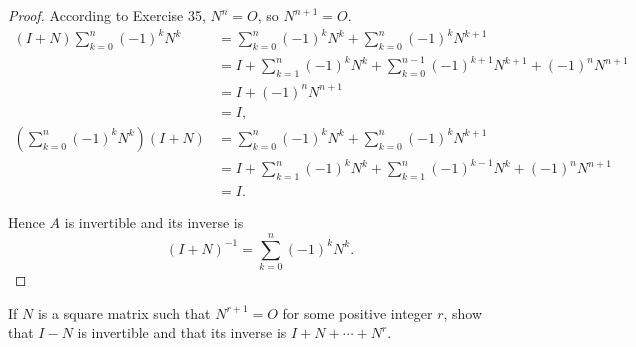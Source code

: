 \begin{proof}
    According to Exercise 35, $N^{n} = O$, so $N^{n+1} = O$.
    \begin{align*}
        (I + N)\sum^{n}_{k=0}{(-1)}^{k}N^{k}              & = \sum^{n}_{k=0}{(-1)}^{k}N^{k} + \sum^{n}_{k=0}{{(-1)}^{k}}N^{k+1}                           \\
                                                          & = I + \sum^{n}_{k=1}{(-1)}^{k}N^{k} + \sum^{n-1}_{k=0}{(-1)}^{k+1}N^{k+1} + {(-1)}^{n}N^{n+1} \\
                                                          & = I + {(-1)}^{n}N^{n+1}                                                                       \\
                                                          & = I,                                                                                          \\
        \left(\sum^{n}_{k=0}{(-1)}^{k}N^{k}\right)(I + N) & = \sum^{n}_{k=0}{(-1)}^{k}N^{k} + \sum^{n}_{k=0}{(-1)}^{k}N^{k+1}                             \\
                                                          & = I + \sum^{n}_{k=1}{(-1)}^{k}N^{k} + \sum^{n}_{k=1}{(-1)}^{k-1}N^{k} + {(-1)}^{n}N^{n+1}     \\
                                                          & = I.
    \end{align*}

    Hence $A$ is invertible and its inverse is
    \[
        {(I + N)}^{-1} = \sum^{n}_{k=0}{(-1)}^{k}N^{k}.
    \]
\end{proof}

\begin{exercise}
    If $N$ is a square matrix such that $N^{r+1} = O$ for some positive integer $r$, show that $I - N$ is invertible and that its inverse is $I + N + \cdots + N^{r}$.
\end{exercise}

